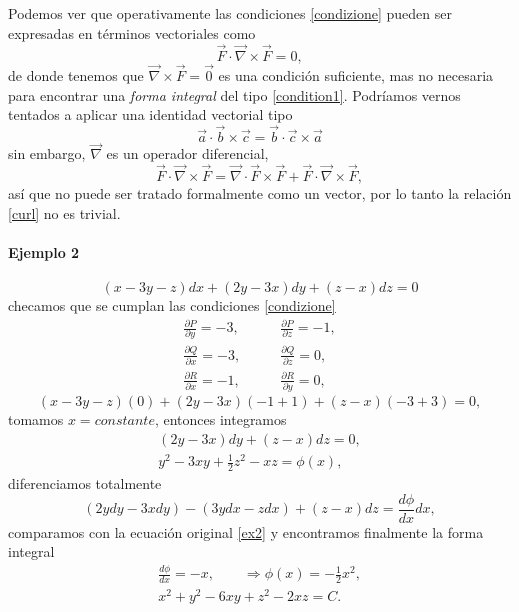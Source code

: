 \documentclass{article}
\theoremstyle{definition} \newtheorem{defi}{Definici\'on}
\theoremstyle{definition} \newtheorem{teo}{Teorema}
\theoremstyle{definition} \newtheorem{cor}{Corolario}
\begin{document}
\subparagraph{}
Podemos ver que operativamente las condiciones \eqref{condizione} pueden ser expresadas en t\'erminos vectoriales como
\begin{equation}\label{curl}
\vec F \cdot \vec \nabla \times \vec F = 0,
\end{equation}
de donde tenemos que $\vec \nabla \times \vec F = \vec 0$ es una condici\'on suficiente, mas no necesaria para encontrar una \emph{forma integral} del tipo \eqref{condition1}. Podr\'iamos vernos tentados a aplicar una identidad vectorial tipo
$$\vec a \cdot \vec b \times \vec c = \vec b \cdot \vec c \times \vec a$$
sin embargo, $\vec \nabla$ es un operador diferencial,
$$\vec F \cdot \vec \nabla \times \vec F = \vec \nabla \cdot \vec F \times \vec F + \vec F \cdot \vec \nabla \times \vec F,$$
as\'i que no puede ser tratado formalmente como un vector, por lo tanto la relaci\'on \eqref{curl} no es trivial.
\paragraph{Ejemplo 2}
\begin{equation}\label{ex2}
(x-3y-z)dx+(2y-3x)dy+(z-x)dz=0
\end{equation}
checamos que se cumplan las condiciones \eqref{condizione}
\begin{align*}
\frac{\partial P}{\partial y} = -3, & \qquad \frac{\partial P}{\partial z} = -1,\\
\frac{\partial Q}{\partial x} = -3, & \qquad \frac{\partial Q}{\partial z} = 0,\\
\frac{\partial R}{\partial x} = -1, & \qquad \frac{\partial R}{\partial y} = 0,
\end{align*}
$$(x-3y-z)(0)+(2y-3x)(-1+1)+(z-x)(-3+3)=0,$$
tomamos $x=constante$, entonces integramos
\begin{align}
(2y-3x)dy+(z-x)dz=0, \nonumber \\
y^2-3xy+\frac{1}{2}z^2-xz=\phi(x), \nonumber
\end{align}
diferenciamos totalmente
$$(2ydy-3xdy)-(3ydx-zdx)+(z-x)dz=\frac{d\phi}{dx}dx,$$
comparamos con la ecuaci\'on original \eqref{ex2} y encontramos finalmente la forma integral
\begin{align}
\frac{d\phi}{dx}=-x,\qquad \Rightarrow \phi(x)=-\frac{1}{2}x^2, \nonumber \\
x^2+y^2-6xy+z^2-2xz=C. \nonumber \\ 
\end{align}
\end{document}
